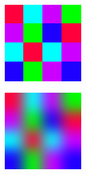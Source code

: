             \begin{figure}
                \centering
                \begin{subfigure}{.333\textwidth}
                    \centering
                    \includegraphics[width=0.9\linewidth]{./images/Nearest_Neighbour_Normal.png}
                    \caption{}
                    \label{fig:example_nearest_neighbour_normal}
                \end{subfigure}%
                \begin{subfigure}{.333\textwidth}
                    \includegraphics[width=0.9\linewidth]{./images/Nearest_Neighbour_Blur_10px.png}

\end{subfigure}
\end{figure}
